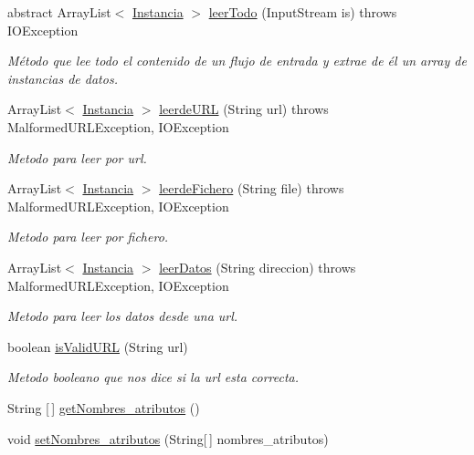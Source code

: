 \begin{DoxyCompactItemize}
\item 
abstract Array\+List$<$ \mbox{\hyperlink{classull_1_1herramientas_1_1opendatachartgenerator_1_1_instancia}{Instancia}} $>$ \mbox{\hyperlink{classull_1_1herramientas_1_1opendatachartgenerator_1_1_i_reader_a4f53ad4ca08020c941157c7d7e1c1407}{leer\+Todo}} (Input\+Stream is)  throws I\+O\+Exception
\begin{DoxyCompactList}\small\item\em Método que lee todo el contenido de un flujo de entrada y extrae de él un array de instancias de datos. \end{DoxyCompactList}\item 
Array\+List$<$ \mbox{\hyperlink{classull_1_1herramientas_1_1opendatachartgenerator_1_1_instancia}{Instancia}} $>$ \mbox{\hyperlink{classull_1_1herramientas_1_1opendatachartgenerator_1_1_i_reader_a824566797fd0023f9d56a706406206f0}{leerde\+U\+RL}} (String url)  throws Malformed\+U\+R\+L\+Exception, I\+O\+Exception 
\begin{DoxyCompactList}\small\item\em Metodo para leer por url. \end{DoxyCompactList}\item 
Array\+List$<$ \mbox{\hyperlink{classull_1_1herramientas_1_1opendatachartgenerator_1_1_instancia}{Instancia}} $>$ \mbox{\hyperlink{classull_1_1herramientas_1_1opendatachartgenerator_1_1_i_reader_a367ada0f7191f71f6501d6c6a1a64aaa}{leerde\+Fichero}} (String file)  throws Malformed\+U\+R\+L\+Exception, I\+O\+Exception 
\begin{DoxyCompactList}\small\item\em Metodo para leer por fichero. \end{DoxyCompactList}\item 
Array\+List$<$ \mbox{\hyperlink{classull_1_1herramientas_1_1opendatachartgenerator_1_1_instancia}{Instancia}} $>$ \mbox{\hyperlink{classull_1_1herramientas_1_1opendatachartgenerator_1_1_i_reader_a73eef4201fbc47bcfa069fe8cd83fee3}{leer\+Datos}} (String direccion)  throws Malformed\+U\+R\+L\+Exception, I\+O\+Exception 
\begin{DoxyCompactList}\small\item\em Metodo para leer los datos desde una url. \end{DoxyCompactList}\item 
boolean \mbox{\hyperlink{classull_1_1herramientas_1_1opendatachartgenerator_1_1_i_reader_a4d0c71c238e6613784f0c618b9236f0d}{is\+Valid\+U\+RL}} (String url)
\begin{DoxyCompactList}\small\item\em Metodo booleano que nos dice si la url esta correcta. \end{DoxyCompactList}\item 
String \mbox{[}$\,$\mbox{]} \mbox{\hyperlink{classull_1_1herramientas_1_1opendatachartgenerator_1_1_i_reader_a2b9de98502df2fe23f2e96b680cd5c95}{get\+Nombres\+\_\+atributos}} ()
\item 
void \mbox{\hyperlink{classull_1_1herramientas_1_1opendatachartgenerator_1_1_i_reader_ad078d928cdbda3f0d5bc324fd6724552}{set\+Nombres\+\_\+atributos}} (String\mbox{[}$\,$\mbox{]} nombres\+\_\+atributos)
\end{DoxyCompactItemize}
